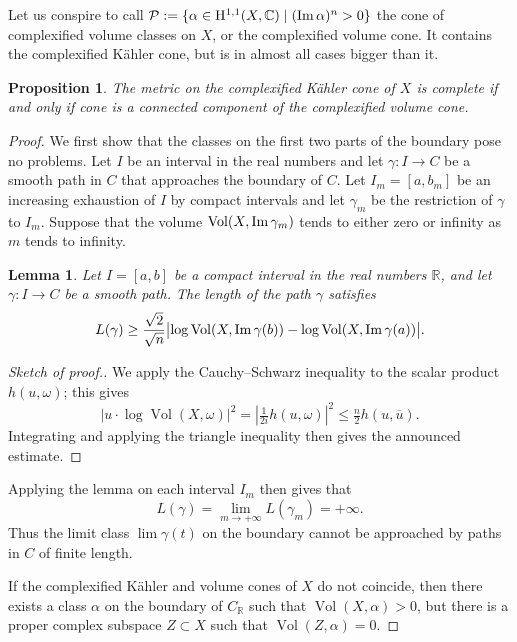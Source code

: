 \documentclass[11pt,a4paper]{amsart}
\newtheorem{prop}[theo]{Proposition}
\newtheorem{lemm}[theo]{Lemma}
\theoremstyle{definition}
\theoremstyle{remark}
\newcommand{\RR}{\mathbb{R}}
\newcommand{\CC}{\mathbb{C}}
\newcommand{\Vol}{\mathop{\mathrm{Vol}}}
\def\Im{\mathop{\rm Im}}
\def\ov#1{\overline{#1}}
\def\coho#1{\mathrm{H}^{#1}}
\def\kf{\omega}
\def\ton{u}
\def\KC{C}
\begin{document}
Let us conspire to call $\mathcal{P} := \{\alpha \in \coho{1,1}(X,\CC)
\mid (\Im\alpha)^n > 0\}$ the cone of complexified volume classes on
$X$, or the complexified volume cone. It contains the complexified
K\"{a}hler cone, but is in almost all cases bigger than it.

\begin{prop}
\label{prop:fofo}
The metric on the complexified K\"{a}hler cone of $X$ is complete if and
only if cone is a connected component of the complexified volume cone.
\end{prop}

\begin{proof}
We first show that the classes on the first two parts of the boundary
pose no problems. Let $I$ be an interval in the real numbers and let
$\gamma : I \to \KC$ be a smooth path in $\KC$ that approaches the
boundary of $\KC$. Let $I_m = [a, b_m]$ be an increasing exhaustion
of $I$ by compact intervals and let $\gamma_m$ be the restriction
of $\gamma$ to $I_m$. Suppose that the volume $\Vol(X,\Im\gamma_m)$
tends to either zero or infinity as $m$ tends to infinity.

\begin{lemm}
Let $I = [a,b]$ be a compact interval in the real numbers $\RR$,
and let $\gamma : I \to \KC$ be a smooth path. The length of
the path $\gamma$  satisfies
$$
L(\gamma) \geq
\frac{\sqrt 2}{\sqrt n}
\bigl| \log \Vol(X,\Im\gamma(b))
- \log \Vol(X,\Im\gamma(a))
\bigr|.
$$
\end{lemm}

\begin{proof}[Sketch of proof.]
We apply the Cauchy--Schwarz inequality to the scalar product
$h(\ton,\kf)$; this gives
$$
|\ton \cdot \log \Vol(X,\kf)|^2 
= |\tfrac{1}{2i}h(\ton,\kf)|^2 \leq \tfrac{n}{2} h(\ton,\ov\ton).
$$
Integrating and applying the triangle inequality then gives the
announced estimate.
\end{proof}

Applying the lemma on each interval $I_m$ then gives that
\begin{equation*}
  L(\gamma) = \lim\limits_{m \to +\infty} L(\gamma_m) = +\infty.
\end{equation*}
Thus the limit class $\lim \gamma(t)$ on the boundary cannot be
approached by paths in $\KC$ of finite length.

If the complexified K\"{a}hler and volume cones of $X$ do not
coincide, then there exists a class $\alpha$ on the boundary of
$\KC_{\RR}$ such that $\Vol(X,\alpha) > 0$, but there is a proper
complex subspace $Z \subset X$ such that $\Vol(Z,\alpha) = 0$.


\end{proof}
\end{document}
